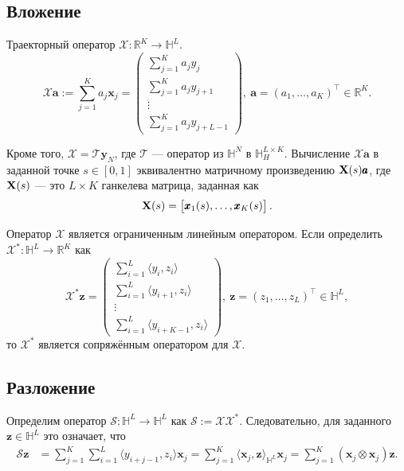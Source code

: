 \documentclass[12pt, specialist, subf
]{disser}
\theoremstyle{definition}
\begin{document}
\subsection*{Вложение}
Траекторный оператор $\mathcal{X}:\mathbb{R}^K \rightarrow \mathbb{H}^L$.
\begin{equation}
	\label{eq:traj}
	\mathcal{X}{\pmb a}:=\sum_{j=1}^K a_j{\pmb x}_j=
	\begin{pmatrix} \sum_{j=1}^K a_jy_j\\ \sum_{j=1}^K a_j y_{j+1}\\ \vdots\\ \sum_{j=1}^K a_j y_{j+L-1} \end{pmatrix},
	\ {\pmb a}=\left(a_1,\ldots, a_K\right)^\top \in\mathbb{R}^K.
\end{equation}

Кроме того, $\mathcal{X}=\mathcal{T}\textbf{y}_N$, где $\mathcal{T}$ — оператор из $\mathbb{H}^N$ в $\mathbb{H}_H^{L\times K}$. Вычисление $\mathcal{X} \pmb{a}$ в заданной точке $s\in [0,1]$ эквивалентно матричному произведению ${\bf X}(s)\pmb{a}$, где ${\bf X}(s)$ — это $L \times K$ ганкелева матрица, заданная как
\begin{equation}\label{ftraj}
	{\bf X}(s)=\begin{bmatrix} {\pmb x}_1(s), \ldots, {\pmb x}_K(s) \end{bmatrix}.
\end{equation}


Оператор $\mathcal{X}$ является ограниченным линейным оператором. Если определить $\mathcal{X}^*:\mathbb{H}^L \rightarrow \mathbb{R}^K$ как
\begin{equation}
	\mathcal{X}^*{\pmb z}=
	\begin{pmatrix} \sum_{i=1}^L \langle y_i, z_i\rangle\\ \sum_{i=1}^L \langle y_{i+1}, z_i\rangle\\ \vdots\\ \sum_{i=1}^L \langle y_{i+K-1}, z_i\rangle \end{pmatrix},
	\ {\pmb z}=\left(z_1,\ldots, z_L\right)^\top\in\mathbb{H}^L,
\end{equation}
то $\mathcal{X}^*$ является сопряжённым оператором для $\mathcal{X}$.

\subsection*{Разложение}
Определим оператор $\mathcal{S}: \mathbb{H}^L\rightarrow \mathbb{H}^L$ как $\mathcal{S}:=\mathcal{X}\mathcal{X}^*$. Следовательно, для заданного ${\pmb z}\in \mathbb{H}^{L}$ это означает, что
\begin{align}\label{eq: s-operator}
	\mathcal{S}{\pmb z} &
	=\sum_{j=1}^K\sum_{i=1}^L \langle y_{i+j-1} , z_i \rangle {\pmb x}_j
	=\sum_{j=1}^K \langle {\pmb x}_j , {\pmb z} \rangle_{\mathbb{H}^L} {\pmb x}_j
	=\sum_{j=1}^K ({\pmb x}_j \otimes {\pmb x}_j) {\pmb z}.
\end{align}
\end{document}
